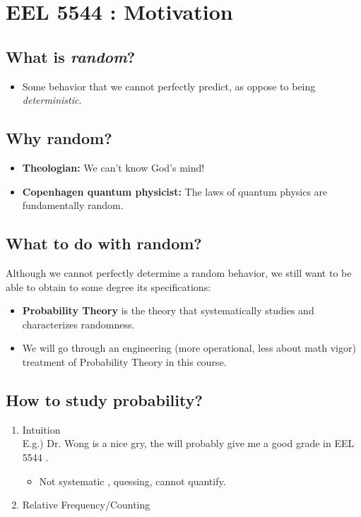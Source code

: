 
\section{EEL 5544 : Motivation}
\subsection{What is \emph{random}?}
\begin{itemize}
  \item Some behavior that we cannot perfectly predict, as oppose to
    being \emph{deterministic}.
\end{itemize}

\subsection{Why random?}
\begin{itemize}
\item \textbf{Theologian:}  We can't know God's mind! 
\item \textbf{Copenhagen quantum physicist:} The laws of quantum physics are fundamentally random.
\end{itemize}
  
\subsection{What to do with random?}
Although we cannot perfectly determine a random behavior, we still want to be
able to obtain to some degree its specifications:
\begin{itemize}
  \item \textbf{Probability Theory} is the theory that systematically studies and characterizes randomness.
  \item We will go through an engineering (more operational, less
    about math vigor) treatment of Probability Theory in this course.
\end{itemize}


\subsection{How to study probability?}
\begin{enumerate}
  \item Intuition\\
E.g.) Dr. Wong is a nice gry, the will probably give me a good grade in EEL 5544 .

\begin{itemize}
  \item[-] Not systematic , quessing, cannot quantify.
\end{itemize}

  \item Relative Frequency/Counting
\end{enumerate}

